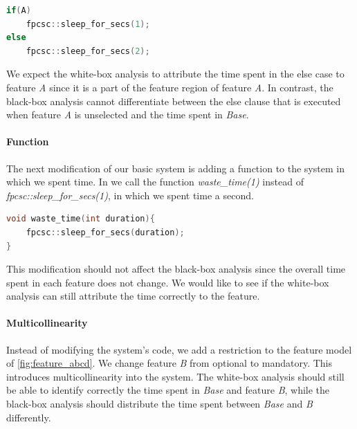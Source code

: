 \begin{minipage}{\linewidth}
    \begin{lstlisting}[language=C++,label={lst:else_case},escapechar=|]
if(A)
    fpcsc::sleep_for_secs(1); 
else
    fpcsc::sleep_for_secs(2);
    \end{lstlisting}
    \end{minipage}

We expect the white-box analysis to attribute the time spent in the else case to feature \emph{A} 
since it is a part of the feature region of feature \emph{A}. 
In contrast, 
the black-box analysis cannot differentiate between the else clause that is executed when feature \emph{A} is unselected and the time spent in \emph{Base}.

\paragraph{Function}\label{ground-truth:Function}
The next modification of our basic system is adding a function to the system in which we spent time. 
In  we call the function \emph{waste\_time(1)} instead of \emph{fpcsc::sleep\_for\_secs(1)}, in which we spent time a second.

\begin{minipage}{\linewidth}
\begin{lstlisting}[language=C++,label={lst:function},escapechar=|]
void waste_time(int duration){
    fpcsc::sleep_for_secs(duration);
}
\end{lstlisting}
\end{minipage}

This modification should not affect the black-box analysis since the overall time spent in each feature does not change. 
We would like to see if the white-box analysis can still attribute the time correctly to the feature.

\paragraph{Multicollinearity}\label{ground-truth:Multicollinearity}
Instead of modifying the system's code, we add a restriction to the feature model of \autoref{fig:feature_abcd}. 
We change feature \emph{B} from optional to mandatory. This introduces multicollinearity into the system. 
The white-box analysis should still be able to identify correctly the time spent in \emph{Base} and feature \emph{B}, 
while the black-box analysis should distribute the time spent between \emph{Base} and \emph{B} differently.

